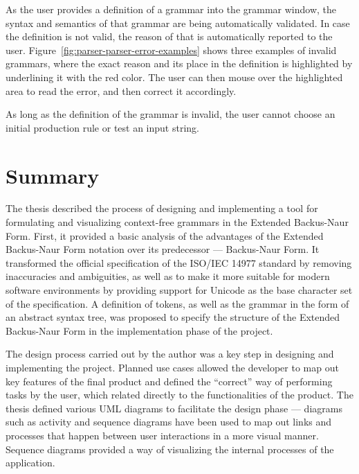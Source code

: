 \documentclass[english,bachelors,forcepolishlogotype]{wizthesis}
\begin{document}
As the user provides a definition of a grammar into the grammar window, the
syntax and semantics of that grammar are being automatically validated. In case
the definition is not valid, the reason of that is automatically reported to the
user. Figure~\ref{fig:parser-parser-error-examples} shows three examples
of invalid grammars, where the exact reason and its place in the definition is
highlighted by underlining it with the red color. The user can then mouse over
the highlighted area to read the error, and then correct it accordingly.

As long as the definition of the grammar is invalid, the user cannot choose
an initial production rule or test an input string.

\chapter{Summary} \label{ch:summary}

The thesis described the process of designing and implementing a tool for
formulating and visualizing context-free grammars in the Extended Backus-Naur
Form. First, it provided a basic analysis of the advantages of the Extended
Backus-Naur Form notation over its predecessor --- Backus-Naur Form. It
transformed the official specification of the ISO/IEC 14977 standard by removing
inaccuracies and ambiguities, as well as to make it more suitable for modern
software environments by providing support for Unicode as the base character set
of the specification. A definition of tokens, as well as the grammar in the form
of an abstract syntax tree, was proposed to specify the structure of the
Extended Backus-Naur Form in the implementation phase of the project.

The design process carried out by the author was a key step in designing and
implementing the project. Planned use cases allowed the developer to map out key
features of the final product and defined the ``correct'' way of performing
tasks by the user, which related directly to the functionalities of the product.
The thesis defined various UML diagrams to facilitate the design phase ---
diagrams such as activity and sequence diagrams have been used to map out links
and processes that happen between user interactions in a more visual manner.
Sequence diagrams provided a way of visualizing the internal processes of the
application.
\end{document}
